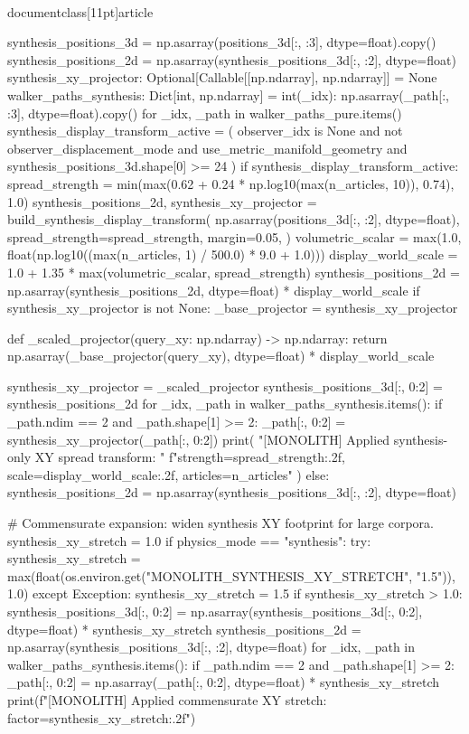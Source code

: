 \\documentclass[11pt]{article}
\begin{document}
\begin{CodeBlock}
{{{{{    synthesis_positions_3d = np.asarray(positions_3d[:, :3], dtype=float).copy()
    synthesis_positions_2d = np.asarray(synthesis_positions_3d[:, :2], dtype=float)
    synthesis_xy_projector: Optional[Callable[[np.ndarray], np.ndarray]] = None
    walker_paths_synthesis: Dict[int, np.ndarray] = {
        int(_idx): np.asarray(_path[:, :3], dtype=float).copy()
        for _idx, _path in walker_paths_pure.items()
    }
    synthesis_display_transform_active = (
        observer_idx is None
        and not observer_displacement_mode
        and use_metric_manifold_geometry
        and synthesis_positions_3d.shape[0] >= 24
    )
    if synthesis_display_transform_active:
        spread_strength = min(max(0.62 + 0.24 * np.log10(max(n_articles, 10)), 0.74), 1.0)
        synthesis_positions_2d, synthesis_xy_projector = build_synthesis_display_transform(
            np.asarray(positions_3d[:, :2], dtype=float),
            spread_strength=spread_strength,
            margin=0.05,
        )
        volumetric_scalar = max(1.0, float(np.log10((max(n_articles, 1) / 500.0) * 9.0 + 1.0)))
        display_world_scale = 1.0 + 1.35 * max(volumetric_scalar, spread_strength)
        synthesis_positions_2d = np.asarray(synthesis_positions_2d, dtype=float) * display_world_scale
        if synthesis_xy_projector is not None:
            _base_projector = synthesis_xy_projector

            def _scaled_projector(query_xy: np.ndarray) -> np.ndarray:
                return np.asarray(_base_projector(query_xy), dtype=float) * display_world_scale

            synthesis_xy_projector = _scaled_projector
        synthesis_positions_3d[:, 0:2] = synthesis_positions_2d
        for _idx, _path in walker_paths_synthesis.items():
            if _path.ndim == 2 and _path.shape[1] >= 2:
                _path[:, 0:2] = synthesis_xy_projector(_path[:, 0:2])
        print(
            "[MONOLITH] Applied synthesis-only XY spread transform: "
            f"strength={spread_strength:.2f}, scale={display_world_scale:.2f}, articles={n_articles}"
        )
    else:
        synthesis_positions_2d = np.asarray(synthesis_positions_3d[:, :2], dtype=float)

    # Commensurate expansion: widen synthesis XY footprint for large corpora.
    synthesis_xy_stretch = 1.0
    if physics_mode == "synthesis":
        try:
            synthesis_xy_stretch = max(float(os.environ.get("MONOLITH_SYNTHESIS_XY_STRETCH", "1.5")), 1.0)
        except Exception:
            synthesis_xy_stretch = 1.5
    if synthesis_xy_stretch > 1.0:
        synthesis_positions_3d[:, 0:2] = np.asarray(synthesis_positions_3d[:, 0:2], dtype=float) * synthesis_xy_stretch
        synthesis_positions_2d = np.asarray(synthesis_positions_3d[:, :2], dtype=float)
        for _idx, _path in walker_paths_synthesis.items():
            if _path.ndim == 2 and _path.shape[1] >= 2:
                _path[:, 0:2] = np.asarray(_path[:, 0:2], dtype=float) * synthesis_xy_stretch
        print(f"[MONOLITH] Applied commensurate XY stretch: factor={synthesis_xy_stretch:.2f}")

}}}}}
\end{CodeBlock}
\end{document}
